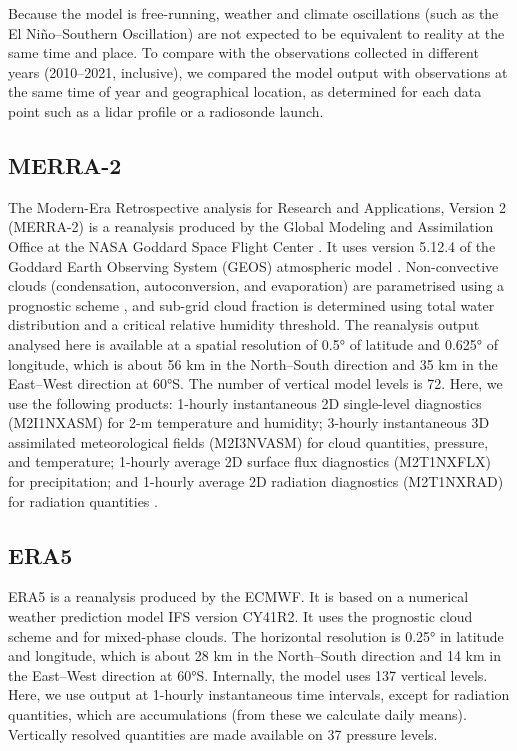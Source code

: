 \documentclass[12pt,a4paper]{article}
\begin{document}
Because the model is free-running, weather and climate oscillations (such as
the El Niño--Southern Oscillation) are not expected to be equivalent to reality
at the same time and place. To compare with the observations collected in
different years (2010--2021, inclusive), we compared the model output with
observations at the same time of year and geographical location, as determined
for each data point such as a lidar profile or a radiosonde launch.

\subsection{MERRA-2}

The Modern-Era Retrospective analysis for Research and Applications, Version 2
(MERRA-2) is a reanalysis produced by the Global Modeling and Assimilation
Office at the NASA Goddard Space Flight Center \citep{gelaro2017}.  It uses
version 5.12.4 of the Goddard Earth Observing System (GEOS) atmospheric model
\citep{rienecker2008,molod2015}. Non-convective clouds (condensation,
autoconversion, and evaporation) are parametrised using a prognostic scheme
\citep{bacmeister2006}, and sub-grid cloud fraction is determined using total
water distribution and a critical relative humidity threshold. The reanalysis
output analysed here is available at a spatial resolution of 0.5° of latitude
and 0.625° of longitude, which is about 56 km in the North--South direction and
35 km in the East--West direction at 60°S. The number of vertical model levels
is 72. Here, we use the following products: 1-hourly instantaneous 2D
single-level diagnostics (M2I1NXASM) for 2-m temperature and humidity; 3-hourly
instantaneous 3D assimilated meteorological fields (M2I3NVASM) for cloud
quantities, pressure, and temperature; 1-hourly average 2D surface flux
diagnostics (M2T1NXFLX) for precipitation; and 1-hourly average 2D radiation
diagnostics (M2T1NXRAD) for radiation quantities \citep{merra2}.

\subsection{ERA5}

ERA5 \citep{era5} is a reanalysis produced by the ECMWF.  It is based on a
numerical weather prediction model IFS version CY41R2.  It uses the
\cite{tiedtke1993} prognostic cloud scheme and \cite{forbes2014} for
mixed-phase clouds. The horizontal resolution is 0.25° in latitude and
longitude, which is about 28 km in the North--South direction and 14 km in the
East--West direction at 60°S.  Internally, the model uses 137 vertical levels.
Here, we use output at 1-hourly instantaneous time intervals, except for
radiation quantities, which are accumulations (from these we calculate daily
means).  Vertically resolved quantities are made available on 37 pressure
levels.
\end{document}
